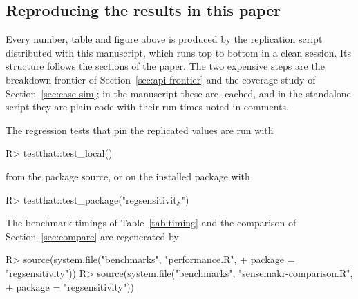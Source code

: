 \documentclass[article]{jss}\usepackage[]{graphicx}\usepackage[]{xcolor}
\begin{document}
\begin{appendix}
\section{Reproducing the results in this paper}\label{app:repro}

Every number, table and figure above is produced by the replication script
 distributed with this manuscript, which runs top to bottom
in a clean session. Its structure follows the sections of the paper. The
two expensive steps are the breakdown frontier of
Section~\ref{sec:api-frontier} and the coverage study of
Section~\ref{sec:case-sim}; in the manuscript these are -cached,
and in the standalone script they are plain code with their run times noted
in comments.

The regression tests that pin the replicated values are run with

\begin{Code}
R> testthat::test_local()
\end{Code}

from the package source, or on the installed package with

\begin{Code}
R> testthat::test_package("regsensitivity")
\end{Code}

The benchmark timings of Table~\ref{tab:timing} and the 
comparison of Section~\ref{sec:compare} are regenerated by

\begin{Code}
R> source(system.file("benchmarks", "performance.R",
+                     package = "regsensitivity"))
R> source(system.file("benchmarks", "sensemakr-comparison.R",
+                     package = "regsensitivity"))
\end{Code}

\end{appendix}
\end{document}
